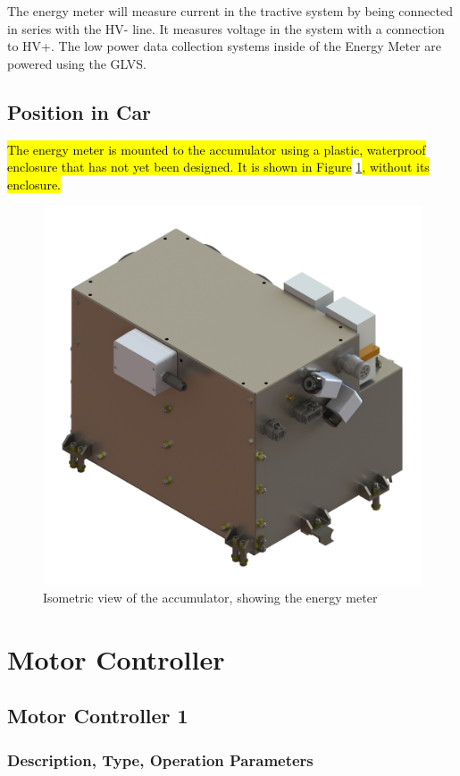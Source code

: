 \documentclass{article}
\DeclareRobustCommand{\hlr}[1]{{\sethlcolor{red}\hl{#1}}}
\begin{document}
        The energy meter will measure current in the tractive system by being connected in series with the HV- line. It measures voltage in the system with a connection to HV+. The low power data collection systems inside of the Energy Meter are powered using the GLVS.

    \subsection{Position in Car}

        \hlr{The energy meter is mounted to the accumulator using a plastic, waterproof enclosure that has not yet been designed. It is shown in Figure} \ref{accumiso}\hlr{, without its enclosure.}

        \begin{figure}[H]
            \centering
            \includegraphics[width = 0.7 \textwidth]{accumulator_isoview}
            \caption{Isometric view of the accumulator, showing the energy meter}
            \label{accumiso}
        \end{figure}

\newpage

\section{Motor Controller} \label{MCs}

    \subsection{Motor Controller 1} \label{MC1}

        \subsubsection{Description, Type, Operation Parameters}
\end{document}
